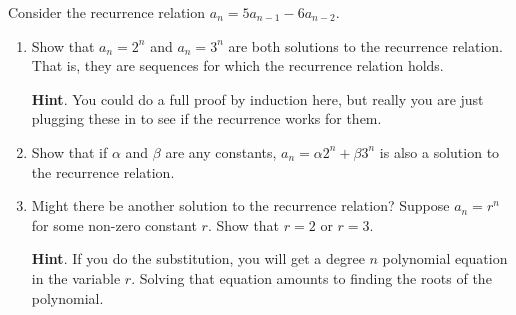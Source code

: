 \documentclass{book}
\begin{document}
\setcounter{cpjt}{148}
\addtocounter{cpjt}{-1}
\begin{activity}\label{activity-141}
\hypertarget{p-946}{}%
Consider the recurrence relation \(a_n = 5a_{n-1} - 6a_{n-2}\).%
\begin{enumerate}[font=\bfseries,label=(\alph*),ref=\alph*]
\item\label{task-180} \hypertarget{p-947}{}%
Show that \(a_n = 2^n\) and \(a_n = 3^n\) are both solutions to the recurrence relation.  That is, they are sequences for which the recurrence relation holds.%
\par\smallskip%
\noindent\textbf{Hint}.\hypertarget{hint-106}{}\quad%
\hypertarget{p-948}{}%
You could do a full proof by induction here, but really you are just plugging these in to see if the recurrence works for them.%
\item\label{task-181} \hypertarget{p-949}{}%
Show that if \(\alpha\) and \(\beta\) are any constants, \(a_n = \alpha 2^n + \beta 3^n\) is also a solution to the recurrence relation.%
\item\label{task-182} \hypertarget{p-950}{}%
Might there be another solution to the recurrence relation?  Suppose \(a_n = r^n\) for some non-zero constant \(r\).  Show that \(r = 2\) or \(r = 3\).%
\par\smallskip%
\noindent\textbf{Hint}.\hypertarget{hint-107}{}\quad%
\hypertarget{p-951}{}%
If you do the substitution, you will get a degree \(n\) polynomial equation in the variable \(r\).  Solving that equation amounts to finding the roots of the polynomial.%
\end{enumerate}
\end{activity}

\clearpage
\end{document}
